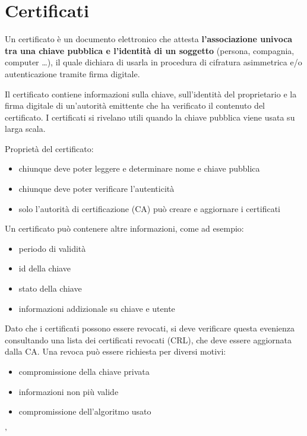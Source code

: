 \chapter{Certificati}

Un certificato è un documento elettronico che attesta \textbf{l'associazione univoca tra 
una chiave pubblica e l'identità di un soggetto} (persona, compagnia, computer \dots), il quale 
dichiara di usarla in procedura di cifratura asimmetrica e/o autenticazione tramite 
firma digitale.

\noindent Il certificato contiene informazioni sulla chiave, sull'identità del proprietario 
e la firma digitale di un'autorità emittente che ha verificato il contenuto del certificato. I 
certificati si rivelano utili quando la chiave pubblica viene usata su larga scala.

\noindent Proprietà del certificato:
\begin{itemize}
    \item chiunque deve poter leggere e determinare nome e chiave pubblica 
    \item chiunque deve poter verificare l'autenticità
    \item solo l'autorità di certificazione (CA) può creare e aggiornare i certificati 
\end{itemize}


\noindent Un certificato può contenere altre informazioni, come ad esempio:
\begin{itemize}
    \item periodo di validità
    \item id della chiave 
    \item stato della chiave 
    \item informazioni addizionale su chiave e utente
\end{itemize}

\noindent Dato che i certificati possono essere revocati, si deve verificare questa evenienza 
consultando una lista dei certificati revocati (CRL), che deve essere aggiornata dalla CA. Una 
revoca può essere richiesta per diversi motivi:
\begin{itemize}
    \item compromissione della chiave privata 
    \item informazioni non più valide 
    \item compromissione dell'algoritmo usato 
\end{itemize}


'